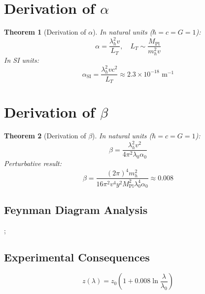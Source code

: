 \documentclass{article}
\newcommand{\Mpl}{M_{\text{Pl}}}
\newtheorem{theorem}{Theorem}[section]
\begin{document}
	\section{Derivation of \(\alpha\)}
	\begin{theorem}[Derivation of \(\alpha\)]
		In natural units (\(\hbar = c = G = 1\)):
		\begin{equation}
			\alpha = \frac{\lambda_h^2 v}{L_T}, \quad L_T \sim \frac{\Mpl}{m_h^2 v}
		\end{equation}
		In SI units:
		\begin{equation}
			\alpha_{\text{SI}} = \frac{\lambda_h^2 v c^2}{L_T} \approx 2.3 \times 10^{-18} \text{ m}^{-1}
		\end{equation}
	\end{theorem}
	
	\section{Derivation of \(\beta\)}
	\begin{theorem}[Derivation of \(\beta\)]
		In natural units (\(\hbar = c = G = 1\)):
		\begin{equation}
			\beta = \frac{\lambda_h^2 v^2}{4\pi^2 \lambda_0 \alpha_0}
		\end{equation}
		Perturbative result:
		\begin{equation}
			\beta = \frac{(2\pi)^4 m_h^2}{16 \pi^2 v^4 y^2 \Mpl^2 \lambda_0^4 \alpha_0} \approx 0.008
		\end{equation}
	\end{theorem}
	
	\subsection{Feynman Diagram Analysis}
	\begin{center}
		;
	\end{center}
	
	\subsection{Experimental Consequences}
	\begin{equation}
		z(\lambda) = z_0 \left(1 + 0.008 \ln \frac{\lambda}{\lambda_0}\right)
	\end{equation}
	
\end{document}
